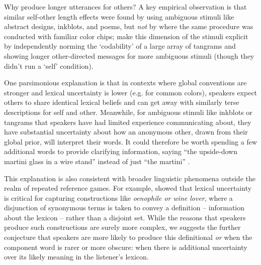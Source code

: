 \documentclass[11pt, floatsintext, jou]{apa6}
\begin{document}
Why produce longer utterances for others? A key empirical observation is that similar self-other length effects were found by  using ambiguous stimuli like abstract designs, inkblots, and poems, but \emph{not} by  where the same procedure was conducted with familiar color chips;  make this dimension of the stimuli explicit by independently norming the `codability' of a large array of tangrams and showing longer other-directed messages for more ambiguous stimuli (though they didn't run a `self' condition).

One parsimonious explanation is that in contexts where global conventions are stronger and lexical uncertainty is lower (e.g. for common colors), speakers expect others to share identical lexical beliefs and can get away with similarly terse descriptions for self and other. Meanwhile, for ambiguous stimuli like inkblots or tangrams that speakers have had limited experience communicating about, they have substantial uncertainty about how an anonymous other, drawn from their global prior, will interpret their words. %
It could therefore be worth spending a few additional words to provide clarifying information, saying ``the upside-down martini glass in a wire stand'' instead of just ``the martini'' \cite{HawkinsFrankGoodman17_ConventionFormation}.  %


This explanation is also consistent with broader linguistic phenomena outside the realm of repeated reference games. For example,  showed that lexical uncertainty is critical for capturing constructions like \emph{oenophile or wine lover}, where a disjunction of synonymous terms is taken to convey a definition -- information about the lexicon -- rather than a disjoint set. While the reasons that speakers produce such constructions are surely more complex, we suggests the further conjecture that speakers are more likely to produce this definitional \emph{or} when the component word is rarer or more obscure: when there is additional uncertainty over its likely meaning in the listener's lexicon. 
\end{document}
